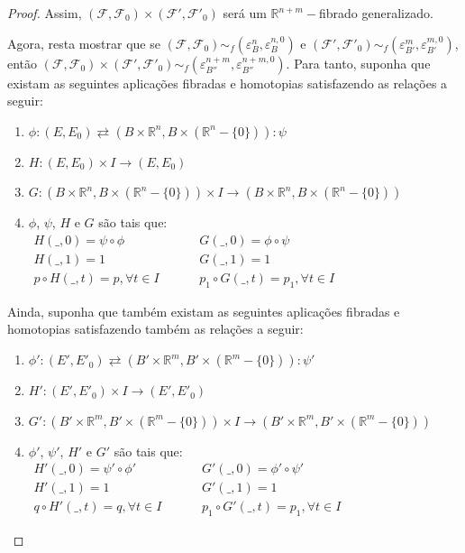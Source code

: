 \documentclass[12pt,oneside]{book} %
\newcommand{\R}{\mathbb{R}}
\begin{document}
\begin{proof}
	\par Assim, $(\mathcal{F},\mathcal{F}_{0})\times(\mathcal{F'},\mathcal{F'}_{0})$ será um $\R^{n+m}-$fibrado generalizado.
	
	\par Agora, resta mostrar que se $(\mathcal{F},\mathcal{F}_{0})\sim_{f}(\varepsilon^{n}_{B},\varepsilon^{n,0}_{B})$ e $(\mathcal{F'},\mathcal{F'}_{0})\sim_{f}(\varepsilon^{m}_{B'},\varepsilon^{m,0}_{B'})$, então $(\mathcal{F},\mathcal{F}_{0})\times(\mathcal{F'},\mathcal{F'}_{0})\sim_{f}(\varepsilon^{n+m}_{B''},\varepsilon^{n+m,0}_{B''})$. Para tanto, suponha que existam as seguintes aplicações fibradas e homotopias satisfazendo as relações a seguir:
	
	\begin{enumerate}
		\item $\phi:(E,E_{0})\rightleftarrows(B\times \R^{n},B\times (\R^{n}-\{ 0 \})):\psi$
		\item $H:(E,E_{0})\times I\to (E,E_{0})$
		\item $G:(B\times\R^{n},B\times(\R^{n}-\{ 0 \}))\times I\to (B\times\R^{n},B\times(\R^{n}-\{ 0 \}))$
		\item $\phi$, $\psi$, $H$ e $G$ são tais que: $\begin{array}{lcccl}
			H(\_,0)=\psi\circ\phi            & & & & G(\_,0)=\phi\circ\psi \\
			H(\_,1)=1                        & & & & G(\_,1)=1 \\
			p\circ H(\_,t)=p, \forall t\in I & & & & p_{1}\circ G(\_,t)=p_{1}, \forall t\in I
		\end{array}$
	\end{enumerate}
	
	\par Ainda, suponha que também existam as seguintes aplicações fibradas e homotopias satisfazendo também as relações a seguir:
	
	\begin{enumerate}
		\item $\phi':(E',E'_{0})\rightleftarrows(B'\times \R^{m},B'\times (\R^{m}-\{ 0 \})):\psi'$
		\item $H':(E',E'_{0})\times I\to (E',E'_{0})$
		\item $G':(B'\times\R^{m},B'\times(\R^{m}-\{ 0 \}))\times I\to (B'\times\R^{m},B'\times(\R^{m}-\{ 0 \}))$
		\item $\phi'$, $\psi'$, $H'$ e $G'$ são tais que: $\begin{array}{lcccl}
			H'(\_,0)=\psi'\circ\phi'            & & & & G'(\_,0)=\phi'\circ\psi' \\
			H'(\_,1)=1                          & & & & G'(\_,1)=1 \\
			q\circ H'(\_,t)=q, \forall t\in I   & & & & p_{1}\circ G'(\_,t)=p_{1}, \forall t\in I
		\end{array}$
	\end{enumerate}
	

\end{proof}
\end{document}
